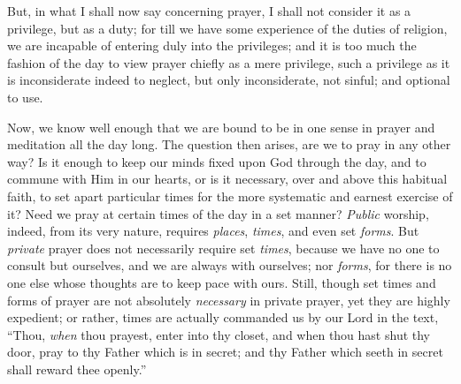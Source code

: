 But, in what I shall now say concerning prayer, I
shall not consider it as a privilege, but as a duty; for
till we have some experience of the duties of religion,
we are incapable of entering duly into the privileges;
and it is too much the fashion of the day to view prayer
chiefly as a mere privilege, such a privilege as it is
inconsiderate indeed to neglect, but only inconsiderate,
not sinful; and optional to use.

Now, we know well enough that we are bound to be in
one sense in prayer and meditation all the day long. The
question then arises, are we to pray in any other way? Is
it enough to keep our minds fixed upon God through the
day, and to commune with Him in our hearts, or is it
necessary, over and above this habitual faith, to set
apart particular times for the more systematic and
earnest exercise of it? Need we pray at certain times of
the day in a set manner? \emph{Public} worship, indeed,
from its very nature, requires \emph{places}, \emph{times},
and even set \emph{forms}. But \emph{private} prayer does
not necessarily require set \emph{times}, because we have
no one to consult but ourselves, and we are always with
ourselves; nor \emph{forms}, for there is no one else
whose thoughts are to keep pace with ours. Still, though
set times and forms of prayer are not absolutely \emph{necessary}
in private prayer, yet they are highly expedient; or
rather, times are actually commanded us by our Lord in
the text, ``Thou, \emph{when} thou prayest, enter
into thy closet, and when thou hast shut thy door, pray
to thy Father which is in secret; and thy Father which
seeth in secret shall reward thee openly.''

